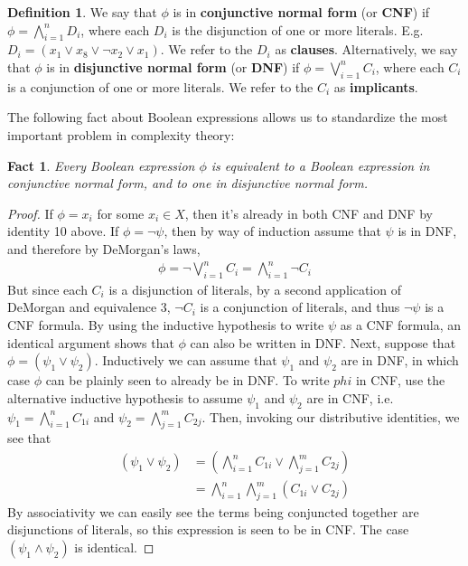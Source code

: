 \documentclass{article}
\theoremstyle{definition}
\newtheorem{definition}{Definition}[section]
\theoremstyle{plain}
\theoremstyle{theorem}
\newtheorem{fact}{Fact}[section]
\begin{document}
\begin{definition}
\par We say that $\phi$ is in \textbf{conjunctive normal form} (or \textbf{CNF}) if $\phi = \bigwedge_{i=1}^{n} D_i$, where each $D_i$ is the disjunction of one or more literals. E.g. $D_i = (x_1 \vee x_8 \vee \neg x_2 \vee x_1)$. We refer to the $D_i$ as \textbf{clauses}. Alternatively, we say that $\phi$ is in \textbf{disjunctive normal form} (or \textbf{DNF}) if $\phi = \bigvee_{i=1}^{n} C_i$, where each $C_i$ is a conjunction of one or more literals. We refer to the $C_i$ as \textbf{implicants}.
\end{definition}
The following fact about Boolean expressions allows us to standardize the most important problem in complexity theory:
\begin{fact}
    Every Boolean expression $\phi$ is equivalent to a Boolean expression in conjunctive normal form, and to one in disjunctive normal form.
\end{fact}
\begin{proof}
If $\phi = x_i$ for some $x_i \in X$, then it's already in both CNF and DNF by identity 10 above. If $\phi = \neg \psi$, then by way of induction assume that $\psi$ is in DNF, and therefore by DeMorgan's laws,
\begin{align}
    \phi = \neg \bigvee_{i=1}^{n} C_i = \bigwedge_{i=1}^n \neg C_i
\end{align}
But since each $C_i$ is a disjunction of literals, by a second application of DeMorgan and equivalence 3, $\neg C_i$ is a conjunction of literals, and thus $\neg \psi$ is a CNF formula. By using the inductive hypothesis to write $\psi$ as a CNF formula, an identical argument shows that $\phi$ can also be written in DNF. Next, suppose that $\phi = (\psi_1 \vee \psi_2)$. Inductively we can assume that $\psi_1$ and $\psi_2$ are in DNF, in which case $\phi$ can be plainly seen to already be in DNF. To write $phi$ in CNF, use the alternative inductive hypothesis to assume $\psi_1$ and $\psi_2$ are in CNF, i.e. $\psi_1 = \bigwedge_{i=1}^{n} C_{1i}$ and $\psi_2 = \bigwedge_{j=1}^{m} C_{2j}$. Then, invoking our distributive identities, we see that
\begin{align}
    (\psi_1 \vee \psi_2) &= (\bigwedge_{i=1}^{n} C_{1i} \vee \bigwedge_{j=1}^{m} C_{2j}) \\
                        &= \bigwedge_{i=1}^{n} \bigwedge_{j=1}^{m} (C_{1i} \vee C_{2j}) 
\end{align}
By associativity we can easily see the terms being conjuncted together are disjunctions of literals, so this expression is seen to be in CNF. The case $(\psi_1 \wedge \psi_2)$ is identical. 
\end{proof}
\end{document}
